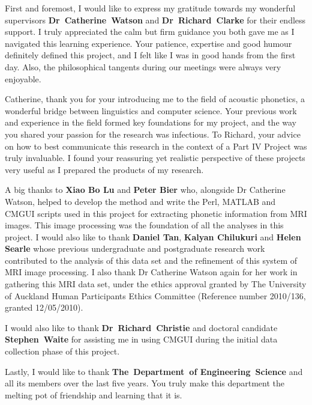 First and foremost, I would like to express my gratitude towards my wonderful supervisors \textbf{Dr~Catherine~Watson} and \textbf{Dr~Richard~Clarke} for their endless support. I truly appreciated the calm but firm guidance you both gave me as I navigated this learning experience. Your patience, expertise and good humour definitely defined this project, and I felt like I was in good hands from the first day. Also, the philosophical tangents during our meetings were always very enjoyable. 

Catherine, thank you for your introducing me to the field of acoustic phonetics, a wonderful bridge between linguistics and computer science. Your previous work and experience in the field formed key foundations for my project, and the way you shared your passion for the research was infectious. To Richard, your advice on how to best communicate this research in the context of a Part IV Project was truly invaluable. I found your reassuring yet realistic perspective of these projects very useful as I prepared the products of my research.

A big thanks to \textbf{Xiao Bo Lu} and \textbf{Peter Bier} who, alongside Dr Catherine Watson, helped to develop the method and write the Perl, MATLAB and CMGUI scripts used in this project for extracting phonetic information from MRI images. This image processing was the foundation of all the analyses in this project. I would also like to thank \textbf{Daniel Tan}, \textbf{Kalyan Chilukuri} and \textbf{Helen Searle} whose previous undergraduate and postgraduate research work contributed to the analysis of this data set and the refinement of this system of MRI image processing. I also thank Dr Catherine Watson again for her work in gathering this MRI data set, under the ethics approval granted by The University of Auckland Human Participants Ethics Committee (Reference number 2010/136, granted 12/05/2010).

I would also like to thank \textbf{Dr~Richard~Christie} and doctoral candidate \textbf{Stephen~Waite} for assisting me in using CMGUI during the initial data collection phase of this project.

Lastly, I would like to thank \textbf{The~Department~of Engineering~Science} and all its members over the last five years. You truly make this department the melting pot of friendship and learning that it is.